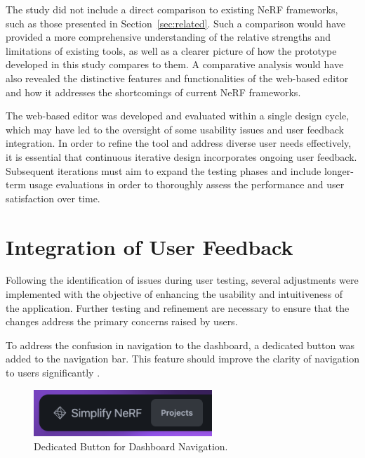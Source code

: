 The study did not include a direct comparison to existing NeRF frameworks, such as those presented in Section~\ref{sec:related}.
Such a comparison would have provided a more comprehensive understanding of the relative strengths and limitations of existing tools, as well as a clearer picture of how the prototype developed in this study compares to them.
A comparative analysis would have also revealed the distinctive features and functionalities of the web-based editor and how it addresses the shortcomings of current NeRF frameworks.

The web-based editor was developed and evaluated within a single design cycle, which may have led to the oversight of some usability issues and user feedback integration.
In order to refine the tool and address diverse user needs effectively, it is essential that continuous iterative design incorporates ongoing user feedback.
Subsequent iterations must aim to expand the testing phases and include longer-term usage evaluations in order to thoroughly assess the performance and user satisfaction over time.

\section{Integration of User Feedback}
\label{sec:discussion:user-feedback}

Following the identification of issues during user testing, several adjustments were implemented with the objective of enhancing the usability and intuitiveness of the application.
Further testing and refinement are necessary to ensure that the changes address the primary concerns raised by users.

To address the confusion in navigation to the dashboard, a dedicated button was added to the navigation bar.
This feature should improve the clarity of navigation to users significantly .

\begin{figure}[htb]
  \centering
	\includegraphics[width=0.6\textwidth]{figures/fix-1.png}
	\caption{Dedicated Button for Dashboard Navigation.}
  \label{fig:fix-1}
\end{figure}

